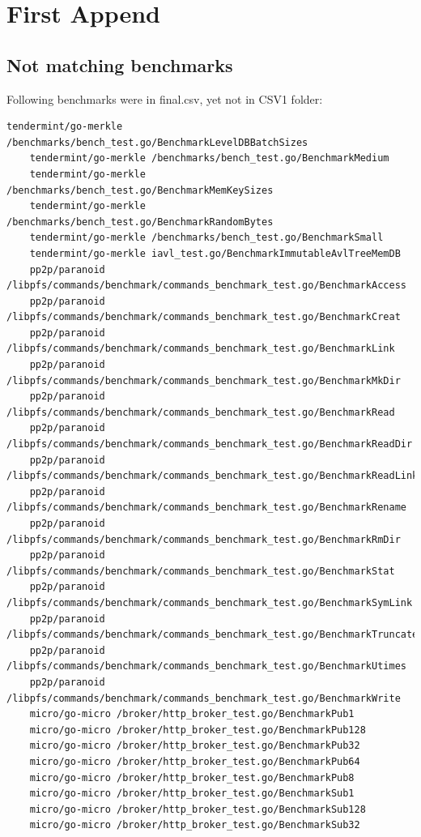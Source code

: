 \documentclass{seal_thesis}
\begin{document}
\appendix
\chapter{First Append}
\section{Not matching benchmarks}
\label{infinalbutnotincsv1}
Following benchmarks were in final.csv, yet not in CSV1 folder:
\begin{lstlisting}[basicstyle=\tiny]
	tendermint/go-merkle /benchmarks/bench_test.go/BenchmarkLevelDBBatchSizes
	tendermint/go-merkle /benchmarks/bench_test.go/BenchmarkMedium
	tendermint/go-merkle /benchmarks/bench_test.go/BenchmarkMemKeySizes
	tendermint/go-merkle /benchmarks/bench_test.go/BenchmarkRandomBytes
	tendermint/go-merkle /benchmarks/bench_test.go/BenchmarkSmall
	tendermint/go-merkle iavl_test.go/BenchmarkImmutableAvlTreeMemDB
	pp2p/paranoid /libpfs/commands/benchmark/commands_benchmark_test.go/BenchmarkAccess
	pp2p/paranoid /libpfs/commands/benchmark/commands_benchmark_test.go/BenchmarkCreat
	pp2p/paranoid /libpfs/commands/benchmark/commands_benchmark_test.go/BenchmarkLink
	pp2p/paranoid /libpfs/commands/benchmark/commands_benchmark_test.go/BenchmarkMkDir
	pp2p/paranoid /libpfs/commands/benchmark/commands_benchmark_test.go/BenchmarkRead
	pp2p/paranoid /libpfs/commands/benchmark/commands_benchmark_test.go/BenchmarkReadDir
	pp2p/paranoid /libpfs/commands/benchmark/commands_benchmark_test.go/BenchmarkReadLink
	pp2p/paranoid /libpfs/commands/benchmark/commands_benchmark_test.go/BenchmarkRename
	pp2p/paranoid /libpfs/commands/benchmark/commands_benchmark_test.go/BenchmarkRmDir
	pp2p/paranoid /libpfs/commands/benchmark/commands_benchmark_test.go/BenchmarkStat
	pp2p/paranoid /libpfs/commands/benchmark/commands_benchmark_test.go/BenchmarkSymLink
	pp2p/paranoid /libpfs/commands/benchmark/commands_benchmark_test.go/BenchmarkTruncate
	pp2p/paranoid /libpfs/commands/benchmark/commands_benchmark_test.go/BenchmarkUtimes
	pp2p/paranoid /libpfs/commands/benchmark/commands_benchmark_test.go/BenchmarkWrite
	micro/go-micro /broker/http_broker_test.go/BenchmarkPub1
	micro/go-micro /broker/http_broker_test.go/BenchmarkPub128
	micro/go-micro /broker/http_broker_test.go/BenchmarkPub32
	micro/go-micro /broker/http_broker_test.go/BenchmarkPub64
	micro/go-micro /broker/http_broker_test.go/BenchmarkPub8
	micro/go-micro /broker/http_broker_test.go/BenchmarkSub1
	micro/go-micro /broker/http_broker_test.go/BenchmarkSub128
	micro/go-micro /broker/http_broker_test.go/BenchmarkSub32

\end{lstlisting}
\end{document}
